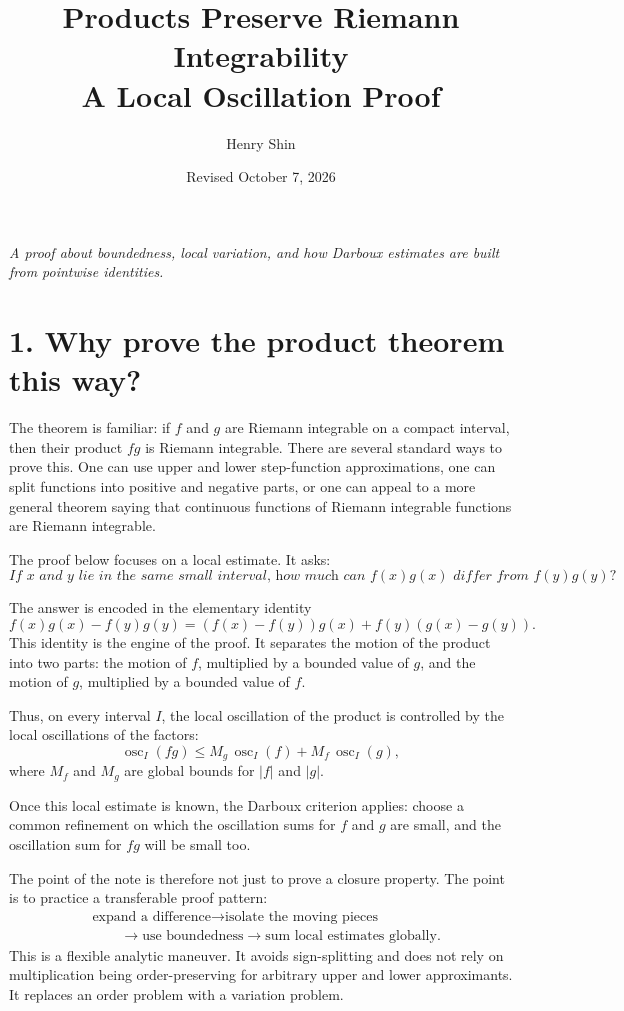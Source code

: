 \documentclass[11pt]{article}
\title{\vspace{-1.4cm}\textbf{Products Preserve Riemann Integrability}\\[0.25em]
\large A Local Oscillation Proof}
\author{Henry Shin}
\date{\small Revised October 7, 2026}
\DeclareMathOperator{\osc}{osc}
\theoremstyle{plain}
\theoremstyle{remark}
\begin{document}
\maketitle
\vspace{-0.7cm}

\begin{center}
\emph{A proof about boundedness, local variation, and how Darboux estimates are built from pointwise identities.}
\end{center}

\section*{1. Why prove the product theorem this way?}

The theorem is familiar: if $f$ and $g$ are Riemann integrable on a compact interval, then their product $fg$ is Riemann integrable. There are several standard ways to prove this. One can use upper and lower step-function approximations, one can split functions into positive and negative parts, or one can appeal to a more general theorem saying that continuous functions of Riemann integrable functions are Riemann integrable.

The proof below focuses on a local estimate. It asks:
\[
    \textit{If $x$ and $y$ lie in the same small interval, how much can $f(x)g(x)$ differ from $f(y)g(y)$?}
\]

The answer is encoded in the elementary identity
\[
    f(x)g(x)-f(y)g(y)
    =(f(x)-f(y))g(x)+f(y)(g(x)-g(y)).
\]
This identity is the engine of the proof. It separates the motion of the product into two parts: the motion of $f$, multiplied by a bounded value of $g$, and the motion of $g$, multiplied by a bounded value of $f$.

Thus, on every interval $I$, the local oscillation of the product is controlled by the local oscillations of the factors:
\[
    \osc_I(fg)
    \leq
    M_g\,\osc_I(f)+M_f\,\osc_I(g),
\]
where $M_f$ and $M_g$ are global bounds for $|f|$ and $|g|$.

Once this local estimate is known, the Darboux criterion applies: choose a common refinement on which the oscillation sums for $f$ and $g$ are small, and the oscillation sum for $fg$ will be small too.

The point of the note is therefore not just to prove a closure property. The point is to practice a transferable proof pattern:
\[
    \begin{aligned}
    &\text{expand a difference}
    \longrightarrow
    \text{isolate the moving pieces}\\
    &\qquad\longrightarrow
    \text{use boundedness}
    \longrightarrow
    \text{sum local estimates globally}.
    \end{aligned}
\]
This is a flexible analytic maneuver. It avoids sign-splitting and does not rely on multiplication being order-preserving for arbitrary upper and lower approximants. It replaces an order problem with a variation problem.
\end{document}
